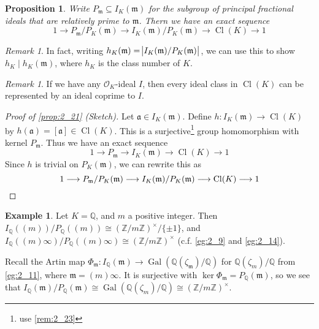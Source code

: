 \documentclass[11pt]{article}
\theoremstyle{definition}
\newtheorem{example}[definition]{Example}
\theoremstyle{plain}
\newtheorem{proposition}[definition]{Proposition}
\theoremstyle{remark}
\newtheorem{remark}[definition]{Remark}
\DeclareMathOperator{\Gal}{Gal}
\DeclareMathOperator{\Cl}{Cl}
\newcommand{\ZZ}{\mathbb{Z}}
\newcommand{\QQ}{\mathbb{Q}}
\newcommand{\cO}{\mathcal{O}}
\newcommand{\fa}{\mathfrak{a}}
\newcommand{\fm}{\mathfrak{m}}
\begin{document}
\begin{proposition}\label{prop:2_21}
    Write $P_\fm \subseteq I_K(\fm)$ for the subgroup of principal fractional ideals that are relatively prime to $\fm$. Thern we have an exact sequence
    \begin{equation*}
        1 \longrightarrow P_\fm/P_K(\fm) \longrightarrow I_K(\fm)/P_K(\fm) \longrightarrow \Cl(K) \longrightarrow 1
    \end{equation*}
\end{proposition}

\begin{remark}\label{rem:2_22}
    In fact, writing $h_K(\fm) = \abs{I_K(\fm)/P_K(\fm)}$, we can use this to show $h_K \mid h_K(\fm)$, where $h_K$ is the class number of $K$.
\end{remark}

\begin{remark}\label{rem:2_23}
    If we have any $\cO_K$-ideal $I$, then every ideal class in $\Cl(K)$ can be represented by an ideal coprime to $I$.
\end{remark}

\begin{proof}[Proof of \autoref{prop:2_21} (Sketch)]
    Let $\fa \in I_K(\fm)$. Define $h : I_K(\fm) \to \Cl(K)$ by $h(\fa) = [\fa] \in \Cl(K)$. This is a surjective\footnote{use \autoref{rem:2_23}} group homomorphism with kernel $P_\fm$. Thus we have an exact sequence
    \begin{equation*}
        1 \longrightarrow P_\fm \longrightarrow I_K(\fm) \longrightarrow \Cl(K) \longrightarrow 1
    \end{equation*}
    Since $h$ is trivial on $P_K(\fm)$, we can rewrite this as
    \begin{equation*}
        1 \longrightarrow P_\fm/P_K(\fm) \longrightarrow I_K(\fm)/P_K(\fm) \longrightarrow \Cl(K) \longrightarrow 1 \qedhere
    \end{equation*}
\end{proof}

\begin{example}\label{eg:2_24}
    Let $K = \QQ$, and $m$ a positive integer. Then $I_\QQ((m))/P_\QQ((m)) \cong (\ZZ/m\ZZ)^\times / \{\pm 1\}$, and $I_\QQ((m)\infty)/P_\QQ((m)\infty) \cong (\ZZ/m\ZZ)^\times$ (c.f. \autoref{eg:2_9} and \autoref{eg:2_14}).

    Recall the Artin map $\Phi_\fm : I_\QQ(\fm) \to \Gal(\QQ(\zeta_\fm) / \QQ)$ for $\QQ(\zeta_m)/\QQ$ from \autoref{eg:2_11}, where $\fm = (m) \infty$. It is surjective with $\ker \Phi_\fm = P_\QQ(\fm)$, so we see that $I_\QQ(\fm)/P_\QQ(\fm) \cong \Gal(\QQ(\zeta_m)/\QQ) \cong (\ZZ/m\ZZ)^\times$.
\end{example}
\end{document}
